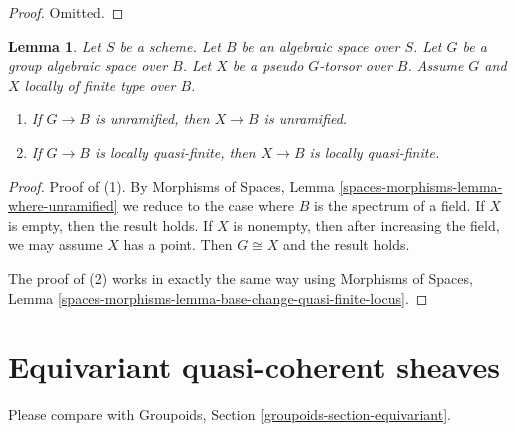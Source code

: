 \documentclass{stacks-project}
\theoremstyle{plain}
\newtheorem{lemma}[subsection]{Lemma}
\theoremstyle{definition}
\theoremstyle{remark}
\numberwithin{equation}{subsection}
\begin{document}
\begin{proof}
Omitted.
\end{proof}

\begin{lemma}
\label{lemma-pseudo-torsor-implications}
Let $S$ be a scheme. Let $B$ be an algebraic space over $S$.
Let $G$ be a group algebraic space over $B$.
Let $X$ be a pseudo $G$-torsor over $B$.
Assume $G$ and $X$ locally of finite type over $B$.
\begin{enumerate}
\item If $G \to B$ is unramified, then $X \to B$ is unramified.
\item If $G \to B$ is locally quasi-finite, then $X \to B$ is
locally quasi-finite.
\end{enumerate}
\end{lemma}

\begin{proof}
Proof of (1). By Morphisms of Spaces, Lemma
\ref{spaces-morphisms-lemma-where-unramified}
we reduce to the case where $B$ is the spectrum of a field.
If $X$ is empty, then the result holds. If $X$ is nonempty,
then after increasing the field, we may assume $X$ has a point.
Then $G \cong X$ and the result holds.

\medskip\noindent
The proof of (2) works in exactly the same way using
Morphisms of Spaces, Lemma
\ref{spaces-morphisms-lemma-base-change-quasi-finite-locus}.
\end{proof}
















\section{Equivariant quasi-coherent sheaves}
\label{section-equivariant}

\noindent
Please compare with
Groupoids, Section \ref{groupoids-section-equivariant}.
\end{document}
